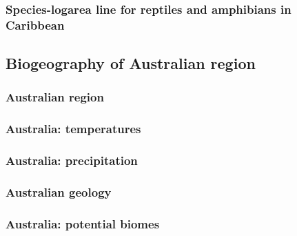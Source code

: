 \documentclass{beamer}
\newcommand{\Max}[1]{\texttt{[image: \#1]}}
\begin{document}

\begin{frame}
\frametitle{Species-logarea line for reptiles and amphibians in Caribbean}

\centering


\end{frame}


\subsection{Biogeography of Australian region}


\begin{frame}
\frametitle{Australian region}

\centering


\end{frame}


\begin{frame}
\frametitle{Australia: temperatures}

\centering


\end{frame}


\begin{frame}
\frametitle{Australia: precipitation}

\centering


\end{frame}


\begin{frame}
\frametitle{Australian geology}

\centering


\end{frame}


\begin{frame}
\frametitle{Australia: potential biomes}

\centering


\end{frame}
\end{document}
